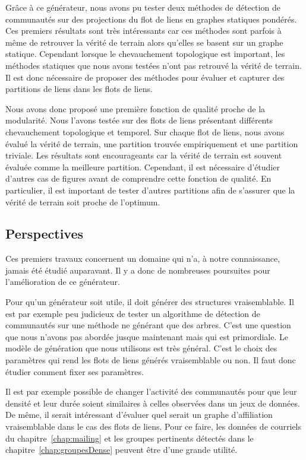 Grâce à ce générateur, nous avons pu tester deux méthodes de détection de communautés sur des projections du flot de liens en graphes statiques pondérés.
Ces premiers résultats sont très intéressants car ces méthodes sont parfois à même de retrouver la vérité de terrain alors qu'elles se basent sur un graphe statique.
Cependant lorsque le chevauchement topologique est important, les méthodes statiques que nous avons testées n'ont pas retrouvé la vérité de terrain.
Il est donc nécessaire de proposer des méthodes pour évaluer et capturer des partitions de liens dans les flots de liens.

Nous avons donc proposé une première fonction de qualité proche de la modularité.
Nous l'avons testée sur des flots de liens présentant différents chevauchement topologique et temporel.
Sur chaque flot de liens, nous avons évalué la vérité de terrain, une partition trouvée empiriquement et une partition triviale.
Les résultats sont encourageants car la vérité de terrain est souvent évaluée comme la meilleure partition.
Cependant, il est nécessaire d'étudier d'autres cas de figures avant de comprendre cette fonction de qualité.
En particulier, il est important de tester d'autres partitions afin de s'assurer que la vérité de terrain soit proche de l'optimum.


\subsection{Perspectives}
Ces premiers travaux concernent un domaine qui n'a, à notre connaissance, jamais été étudié auparavant.
Il y a donc de nombreuses poursuites pour l'amélioration de ce générateur.


Pour qu'un générateur soit utile, il doit générer des structures vraisemblable.
Il est par exemple peu judicieux de tester un algorithme de détection de communautés sur une méthode ne générant que des arbres.
C'est une question que nous n'avons pas abordée jusque maintenant mais qui est primordiale.
Le modèle de génération que nous utilisons est très général.
C'est le choix des paramètres qui rend les flots de liens générés vraisemblable ou non.
Il faut donc étudier comment fixer ses paramètres.

Il est par exemple possible de changer l'activité des communautés pour que leur densité et leur durée soient similaires à celles observées dans un jeux de données.
De même, il serait intéressant d'évaluer quel serait un graphe d'affiliation vraisemblable dans le cas des flots de liens.
Pour ce faire, les données de courriels du chapitre~\ref{chap:mailing} et les groupes pertinents détectés dans le chapitre~\ref{chap:groupesDense} peuvent être d'une grande utilité.

